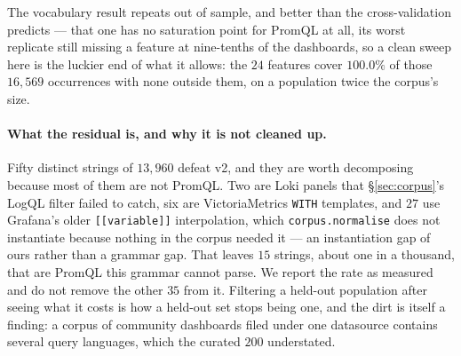 The vocabulary result repeats out of sample, and better than the cross-validation
predicts --- that one has no saturation point for PromQL at all, its worst replicate
still missing a feature at nine-tenths of the dashboards, so a clean sweep here is
the luckier end of what it allows: the
$24$ features cover $100.0\%$ of those $16{,}569$ occurrences with none outside them, on
a population twice the corpus's size.

\paragraph{What the residual is, and why it is not cleaned up.}
Fifty distinct strings of $13{,}960$ defeat v2, and they are worth decomposing because
most of them are not PromQL. Two are Loki panels that \S\ref{sec:corpus}'s LogQL filter
failed to catch, six are VictoriaMetrics \texttt{WITH} templates, and $27$ use Grafana's
older \texttt{[[variable]]} interpolation, which \texttt{corpus.normalise} does not
instantiate because nothing in the corpus needed it --- an instantiation gap of ours
rather than a grammar gap. That leaves $15$ strings, about one in a thousand, that are
PromQL this grammar cannot parse. We report the rate as measured and do not remove the
other $35$ from it. Filtering a held-out population after seeing what it costs is how a
held-out set stops being one, and the dirt is itself a finding: a corpus of community
dashboards filed under one datasource contains several query languages, which the
curated $200$ understated.

